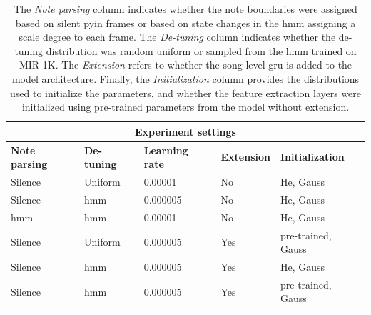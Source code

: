 \begin{table}
\centering
\begin{tabularx}{\columnwidth}{ |X|X|X|X|X| } 
\hline
\multicolumn{5}{|c|}{\textbf{Experiment settings}}\\
\hline\hline
\textbf{Note parsing} & \textbf{De-tuning} & \textbf{Learning rate} & \textbf{Extension} & \textbf{Initialization} \\
\hline\hline
Silence & Uniform & 0.00001 & No & He, Gauss \\
\hline
Silence & \gls{hmm} & 0.000005 & No & He, Gauss\\ 
\hline
\gls{hmm} & \gls{hmm} & 0.00001 & No & He, Gauss\\ 
\hline
Silence & Uniform & 0.000005 & Yes & pre-trained, Gauss\\
\hline
Silence & \gls{hmm} & 0.000005 & Yes & He, Gauss\\ 
\hline
Silence & \gls{hmm} & 0.000005 & Yes & pre-trained, Gauss\\ 
\hline
\end{tabularx}
\label{table:experiments}
\caption{The \textit{Note parsing} column indicates whether the note boundaries were assigned based on silent \gls{pyin} frames or based on state changes in the \gls{hmm} assigning a scale degree to each frame. The \textit{De-tuning} column indicates whether the de-tuning distribution was random uniform or sampled from the \gls{hmm} trained on MIR-1K. The \textit{Extension} refers to whether the song-level \gls{gru} is added to the model architecture. Finally, the \textit{Initialization} column provides the distributions used to initialize the parameters, and whether the feature extraction layers were initialized using pre-trained parameters from the model without extension.}
\end{table}

